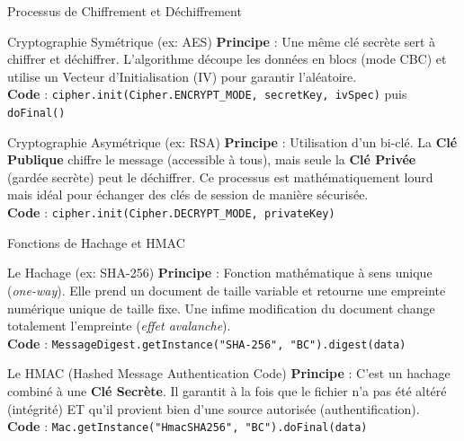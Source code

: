 \documentclass[aspectratio=169,xcolor=dvipsnames]{beamer}
\begin{document}
\begin{frame}{Processus de Chiffrement et Déchiffrement}
	\begin{block}{Cryptographie Symétrique (ex: AES)}
		\textbf{Principe} : Une même clé secrète sert à chiffrer et déchiffrer. L'algorithme découpe les données en blocs (mode CBC) et utilise un Vecteur d'Initialisation (IV) pour garantir l'aléatoire.\\
		\textbf{Code} : \texttt{cipher.init(Cipher.ENCRYPT\_MODE, secretKey, ivSpec)} puis \texttt{doFinal()}
	\end{block}
	
	\begin{block}{Cryptographie Asymétrique (ex: RSA)}
		\textbf{Principe} : Utilisation d'un bi-clé. La \textbf{Clé Publique} chiffre le message (accessible à tous), mais seule la \textbf{Clé Privée} (gardée secrète) peut le déchiffrer. Ce processus est mathématiquement lourd mais idéal pour échanger des clés de session de manière sécurisée.\\
		\textbf{Code} : \texttt{cipher.init(Cipher.DECRYPT\_MODE, privateKey)}
	\end{block}
\end{frame}

\begin{frame}{Fonctions de Hachage et HMAC}
	\begin{alertblock}{Le Hachage (ex: SHA-256)}
		\textbf{Principe} : Fonction mathématique à sens unique (\textit{one-way}). Elle prend un document de taille variable et retourne une empreinte numérique unique de taille fixe. Une infime modification du document change totalement l'empreinte (\textit{effet avalanche}).\\
		\textbf{Code} : \texttt{MessageDigest.getInstance("SHA-256", "BC").digest(data)}
	\end{alertblock}
	
	\begin{examples}{Le HMAC (Hashed Message Authentication Code)}
		\textbf{Principe} : C'est un hachage combiné à une \textbf{Clé Secrète}. Il garantit à la fois que le fichier n'a pas été altéré (intégrité) ET qu'il provient bien d'une source autorisée (authentification).\\
		\textbf{Code} : \texttt{Mac.getInstance("HmacSHA256", "BC").doFinal(data)}
	\end{examples}
\end{frame}
\end{document}
